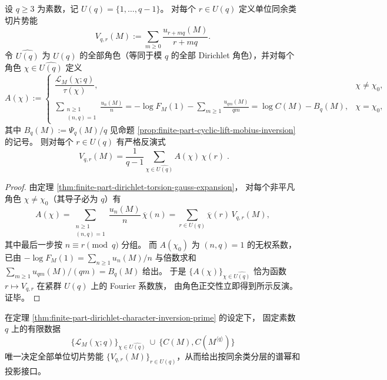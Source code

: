 \begin{theorem}\label{thm:finite-part-dirichlet-character-inversion-prime}
设 \(q\ge3\) 为素数，记 \(U(q)=\{1,\dots,q-1\}\)。
对每个 \(r\in U(q)\) 定义单位同余类切片势能
\[
V_{q,r}(M):=\sum_{m\ge0}\frac{u_{r+mq}(M)}{r+mq}.
\]
令 \(\widehat{U(q)}\) 为 \(U(q)\) 的全部角色（等同于模 \(q\) 的全部 Dirichlet 角色），并对每个角色 \(\chi\in\widehat{U(q)}\) 定义
\[
A(\chi):=
\begin{cases}
\dfrac{\mathcal{L}_M(\chi;q)}{\tau(\chi)}, & \chi\neq\chi_0,\\[10pt]
\displaystyle \sum_{\substack{n\ge1\\(n,q)=1}}\frac{u_n(M)}{n}
=-\log F_M(1)-\sum_{m\ge1}\frac{u_{qm}(M)}{qm}
=\log C(M)-B_q(M), & \chi=\chi_0,
\end{cases}
\]
其中 \(B_q(M):=\Psi_q(M)/q\) 见命题 \ref{prop:finite-part-cyclic-lift-mobius-inversion} 的记号。
则对每个 \(r\in U(q)\) 有严格反演式
\[
\boxed{\;
V_{q,r}(M)=\frac{1}{q-1}\sum_{\chi\in\widehat{U(q)}}A(\chi)\,\chi(r)\; }.
\]
\end{theorem}
\begin{proof}
由定理 \ref{thm:finite-part-dirichlet-torsion-gauss-expansion}，
对每个非平凡角色 \(\chi\neq\chi_0\)（其导子必为 \(q\)）有
\[
A(\chi)
=\sum_{\substack{n\ge1\\(n,q)=1}}\frac{u_n(M)}{n}\,\overline{\chi}(n)
=\sum_{r\in U(q)}\overline{\chi}(r)\,V_{q,r}(M),
\]
其中最后一步按 \(n\equiv r\pmod q\) 分组。
而 \(A(\chi_0)\) 为 \((n,q)=1\) 的无权系数，已由 \(-\log F_M(1)=\sum_{n\ge1}u_n(M)/n\) 与倍数求和 \(\sum_{m\ge1}u_{qm}(M)/(qm)=B_q(M)\) 给出。
于是 \(\{A(\chi)\}_{\chi\in\widehat{U(q)}}\) 恰为函数 \(r\mapsto V_{q,r}\) 在紧群 \(U(q)\) 上的 Fourier 系数族，
由角色正交性立即得到所示反演。证毕。
\end{proof}

\begin{corollary}\label{cor:finite-part-dirichlet-character-single-layer-complete-prime}
在定理 \ref{thm:finite-part-dirichlet-character-inversion-prime} 的设定下，
固定素数 \(q\) 上的有限数据
\[
\bigl\{\mathcal{L}_M(\chi;q)\bigr\}_{\chi\in\widehat{U(q)}}\ \cup\ \{C(M),C(M^{\langle q\rangle})\}
\]
唯一决定全部单位切片势能 \(\{V_{q,r}(M)\}_{r\in U(q)}\)，从而给出按同余类分层的谱幂和投影接口。
\end{corollary}

